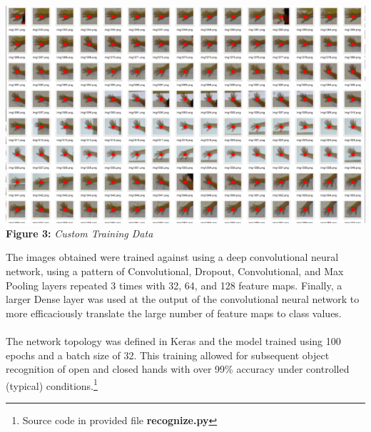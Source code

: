 \documentclass[twoside,twocolumn]{article}
\begin{document}
\begin{center}
\includegraphics[scale=0.25]{training_data} \\
\vspace{0.25cm}
\small{\textbf{Figure 3:} \textit{Custom Training Data}}
\end{center}

The images obtained were trained against using a deep convolutional neural network, using a pattern of Convolutional, Dropout, Convolutional, and Max Pooling layers repeated 3 times with 32, 64, and 128 feature maps. Finally, a larger Dense layer was used at the output of the convolutional neural network to more efficaciously translate the large number of feature maps to class values. \\ \\
The network topology was defined in Keras and the model trained using 100 epochs and a batch size of 32. This training allowed for subsequent object recognition of open and closed hands with over 99\% accuracy under controlled (typical) conditions.\footnote{Source code in provided file \textbf{recognize.py}}
\end{document}
